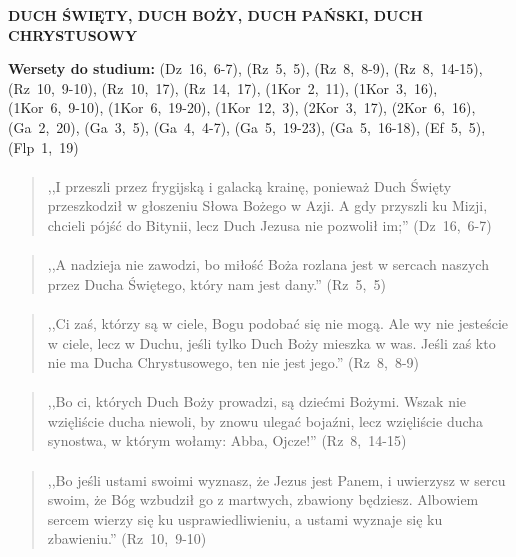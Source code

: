 \documentclass[10pt,a4paper,oneside]{article}
\begin{document}
\centerline{\textbf{\MakeUppercase{Duch Święty, Duch Boży, Duch Pański, Duch Chrystusowy}}}
\begin{center}
\textbf{Wersety do studium:} 
\mbox{(Dz 16, 6-7)}, \mbox{(Rz 5, 5)}, \mbox{(Rz 8, 8-9)}, \mbox{(Rz 8, 14-15)}, \mbox{(Rz 10, 9-10)}, \mbox{(Rz 10, 17)}, \mbox{(Rz 14, 17)}, \mbox{(1Kor 2, 11)}, \mbox{(1Kor 3, 16)}, \mbox{(1Kor 6, 9-10)}, \mbox{(1Kor 6, 19-20)}, \mbox{(1Kor 12, 3)}, \mbox{(2Kor 3, 17)}, \mbox{(2Kor 6, 16)}, \mbox{(Ga 2, 20)}, \mbox{(Ga 3, 5)}, \mbox{(Ga 4, 4-7)}, \mbox{(Ga 5, 19-23)}, \mbox{(Ga 5, 16-18)}, \mbox{(Ef 5, 5)}, \mbox{(Flp 1, 19)}
\end{center}
\paragraph{}
\begin{quote}
,,I przeszli przez frygijską i galacką krainę, ponieważ Duch Święty przeszkodził w głoszeniu Słowa Bożego w Azji. A gdy przyszli ku Mizji, chcieli pójść do Bitynii, lecz Duch Jezusa nie pozwolił im;'' \mbox{(Dz 16, 6-7)}
\end{quote}
\paragraph{}
\begin{quote}
,,A nadzieja nie zawodzi, bo miłość Boża rozlana jest w sercach naszych przez Ducha Świętego, który nam jest dany.'' \mbox{(Rz 5, 5)}
\end{quote}
\paragraph{}
\begin{quote}
,,Ci zaś, którzy są w ciele, Bogu podobać się nie mogą. Ale wy nie jesteście w ciele, lecz w Duchu, jeśli tylko Duch Boży mieszka w was. Jeśli zaś kto nie ma Ducha Chrystusowego, ten nie jest jego.'' \mbox{(Rz 8, 8-9)}
\end{quote}
\paragraph{}
\begin{quote}
,,Bo ci, których Duch Boży prowadzi, są dziećmi Bożymi. Wszak nie wzięliście ducha niewoli, by znowu ulegać bojaźni, lecz wzięliście ducha synostwa, w którym wołamy: Abba, Ojcze!'' \mbox{(Rz 8, 14-15)}
\end{quote}
\paragraph{}
\begin{quote}
,,Bo jeśli ustami swoimi wyznasz, że Jezus jest Panem, i uwierzysz w sercu swoim, że Bóg wzbudził go z martwych, zbawiony będziesz. Albowiem sercem wierzy się ku usprawiedliwieniu, a ustami wyznaje się ku zbawieniu.'' \mbox{(Rz 10, 9-10)}
\end{quote}
\end{document}
